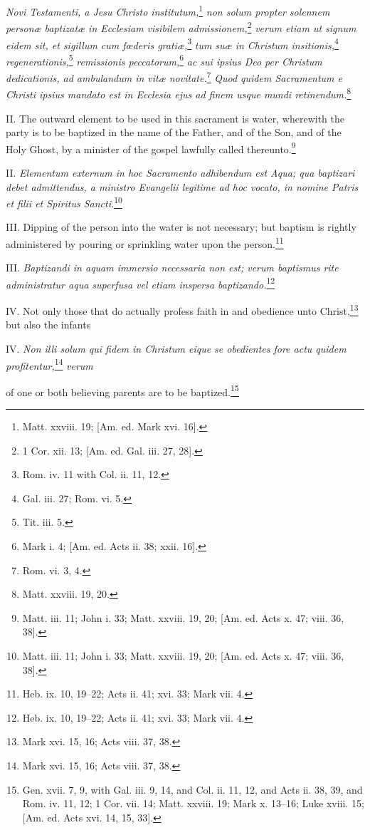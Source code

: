 \emph{Novi Testamenti, a Jesu Christo institutum,}\footnote{Matt. xxviii. 19; [Am. ed. Mark xvi. 16].}\emph{ non solum propter solennem personæ baptizatæ in Ecclesiam visibilem admissionem,}\footnote{1 Cor. xii. 13; [Am. ed. Gal. iii. 27, 28].}\emph{ verum etiam ut signum eidem sit, et sigillum cum fœderis gratiæ,}\footnote{Rom. iv. 11 with Col. ii. 11, 12.}\emph{ tum suæ in Christum insitionis,}\footnote{Gal. iii. 27; Rom. vi. 5.}\emph{ regenerationis,}\footnote{Tit. iii. 5.}\emph{ remissionis peccatorum,}\footnote{Mark i. 4; [Am. ed. Acts ii. 38; xxii. 16].}\emph{ ac sui ipsius Deo per Christum dedicationis, ad ambulandum in vitæ novitate.}\footnote{Rom. vi. 3, 4.}\emph{ Quod quidem Sacramentum e Christi ipsius mandato est in Ecclesia ejus ad finem usque mundi retinendum.}\footnote{Matt. xxviii. 19, 20.}

II. The outward element to be used in this sacrament is water, wherewith the party is to be baptized in the name of the Father, and of the Son, and of the Holy Ghost, by a minister of the gospel lawfully called thereunto.\footnote{Matt. iii. 11; John i. 33; Matt. xxviii. 19, 20; [Am. ed. Acts x. 47; viii. 36, 38].}

II. \emph{Elementum externum in hoc Sacramento adhibendum est Aqua; qua baptizari debet admittendus, a ministro Evangelii legitime ad hoc vocato, in nomine Patris et filii et Spiritus Sancti.}\footnote{Matt. iii. 11; John i. 33; Matt. xxviii. 19, 20; [Am. ed. Acts x. 47; viii. 36, 38].}

III. Dipping of the person into the water is not necessary; but baptism is rightly administered by pouring or sprinkling water upon the person.\footnote{Heb. ix. 10, 19–22; Acts ii. 41; xvi. 33; Mark vii. 4.}

III. \emph{Baptizandi in aquam immersio necessaria non est; verum baptismus rite administratur aqua superfusa vel etiam inspersa baptizando.}\footnote{Heb. ix. 10, 19–22; Acts ii. 41; xvi. 33; Mark vii. 4.}

IV. Not only those that do actually profess faith in and obedience unto Christ,\footnote{Mark xvi. 15, 16; Acts viii. 37, 38.} but also the infants

IV. \emph{Non illi solum qui fidem in Christum eique se obedientes fore actu quidem profitentur,}\footnote{Mark xvi. 15, 16; Acts viii. 37, 38.}\emph{ verum }

of one or both believing parents are to be baptized.\footnote{Gen. xvii. 7, 9, with Gal. iii. 9, 14, and Col. ii. 11, 12, and Acts ii. 38, 39, and Rom. iv. 11, 12; 1 Cor. vii. 14; Matt. xxviii. 19; Mark x. 13–16; Luke xviii. 15; [Am. ed. Acts xvi. 14, 15, 33].}

